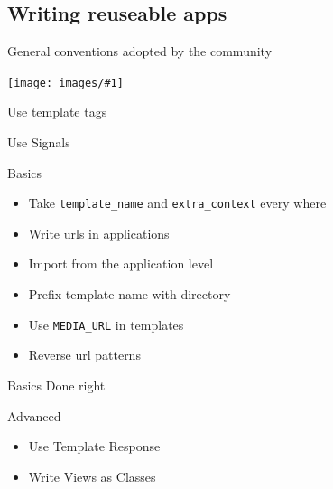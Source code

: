 \documentclass[19.9pt]{beamer}
\newcommand{\img}[1]{
			\begin{center}
				\texttt{[image: images/\#1]}
			\end{center}		
}
\newcommand{\pycode}[1]{
			\lstset{language=python}			
				 
}
\newcommand{\pycodesm}[1]{
			\small
			\pycode{#1}
}
\begin{document}
	\subsection{Writing reuseable apps}
		\begin{frame}
			{General conventions adopted by the community}
			\img{keepleft.jpg}
		\end{frame}
		\begin{frame}[fragile]
			{Use template tags}                                              
			\pycodesm{templatetag.py}
		\end{frame}
		\begin{frame}
			{Use Signals}                                              
			\pycodesm{signals.py}
		\end{frame}
		\begin{frame}[fragile]
			{Basics}                                                       
		\begin{itemize}[<+-| alert@+>]                                                    \item
			Take \verb|template_name| and \verb|extra_context| every where          \item
			Write urls in applications                                             \item
			Import from the application level                        \item
			Prefix template name with directory                      \item
			Use \verb|MEDIA_URL| in templates                        \item
			Reverse url patterns
		\end{itemize}
		\end{frame}
		\begin{frame}
		{Basics Done right}
			\pycodesm{basicright.py}
		\end{frame}
		\begin{frame}
			{Advanced}                              
		\begin{itemize}[<+-| alert@+>]                                                 
			\item
			Use Template Response                                           
			 \item
			Write Views as Classes
		\end{itemize}
		\end{frame}
		
\end{document}
